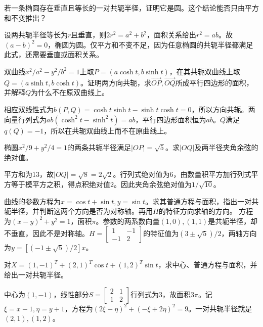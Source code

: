 若一条椭圆存在垂直且等长的一对共轭半径，证明它是圆。这个结论能否只由平方和不变推出？
\par
\solutionanswer
设两共轭半径等长为\(r\)且垂直，则\(2r^2=a^2+b^2\)，面积关系给出\(r^2=ab\)。故\((a-b)^2=0\)，椭圆为圆。仅平方和不变不足，因为任意椭圆的共轭半径都满足此式，还需要垂直或面积关系。


双曲线\(x^2/a^2-y^2/b^2=1\)上取\(P=(a\cosh t,b\sinh t)\)，在其共轭双曲线上取\(Q=(a\sinh t,b\cosh t)\)。证明两方向共轭，求\(\overrightarrow{OP},\overrightarrow{OQ}\)所成平行四边形的面积，并解释\(Q\)为什么不在原双曲线上。
\par
\solutionanswer
相应双线性式为\(b(P,Q)=\cosh t\sinh t-\sinh t\cosh t=0\)，所以方向共轭。两向量行列式为\(ab(\cosh^2t-\sinh^2t)=ab\)，平行四边形面积恒为\(ab\)。\(Q\)满足\(q(Q)=-1\)，所以在共轭双曲线上而不在原曲线上。


椭圆\(x^2/9+y^2/4=1\)的两条共轭半径满足\(|OP|=\sqrt5\)。求\(|OQ|\)及两半径夹角余弦的绝对值。
\par
\solutionanswer
平方和为\(13\)，故\(|OQ|=\sqrt8=2\sqrt2\)。行列式绝对值为\(6\)，由数量积平方加行列式平方等于模平方之积，得点积绝对值\(2\)。因此夹角余弦绝对值为\(1/\sqrt{10}\)。


曲线的参数方程为\(x=\cos t+\sin t,y=\sin t\)。求其普通方程与面积，指出一对共轭半径，并判断这两个方向是否为对称轴。再用\(H\)的特征方向求轴的方向。
\solutionanswer
方程为\((x-y)^2+y^2=1\)，面积\(\pi\)。参数的两系数向量\((1,0),(1,1)\)是共轭半径，却不垂直，因此不是对称轴。\(H=\begin{bmatrix}1&-1\\-1&2\end{bmatrix}\)的特征值为\((3\pm\sqrt5)/2\)，两轴方向为\(y=[(-1\pm\sqrt5)/2]x\)。


对\(X=(1,-1)^T+(2,1)^T\cos t+(1,2)^T\sin t\)，求中心、普通方程与面积，并给出一对共轭半径。
\par
\solutionanswer
中心为\((1,-1)\)，线性部分\(S=\begin{bmatrix}2&1\\1&2\end{bmatrix}\)行列式为\(3\)，故面积\(3\pi\)。记\(\xi=x-1,\eta=y+1\)，方程为\((2\xi-\eta)^2+(-\xi+2\eta)^2=9\)。一对共轭半径就是\((2,1),(1,2)\)。


